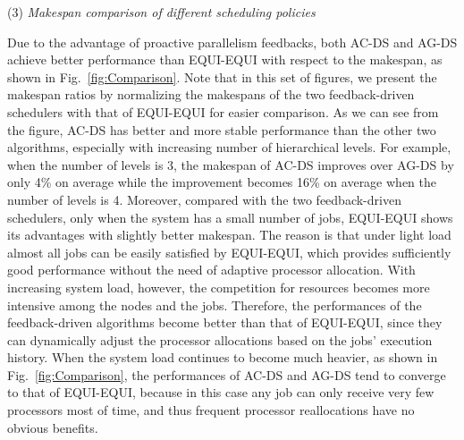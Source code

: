 \documentclass[10pt, a4paper]{article}
\newcommand{\figref}[1]         {Fig.~\ref{fig:#1}}
\begin{document}
\begin{figure*}[t]
\centering

    \caption{Makespan comparisons of AC-DS and AG-DS with EQUI-EQUI.}
    \label{fig:Comparison}
\end{figure*}

\indent(3) \emph{Makespan comparison of different scheduling policies}

Due to the advantage of proactive parallelism feedbacks, both AC-DS and AG-DS achieve better
performance than EQUI-EQUI with respect to the makespan, as shown in \figref{Comparison}. Note that
in this set of figures, we present the makespan ratios by normalizing the makespans of the two
feedback-driven schedulers with that of EQUI-EQUI for easier comparison. As we can see from the
figure, AC-DS has better and more stable performance than the other two algorithms, especially with
increasing number of hierarchical levels. For example, when the number of levels is 3, the makespan
of AC-DS improves over AG-DS by only 4\% on average while the improvement becomes 16\% on average
when the number of levels is 4. Moreover, compared with the two feedback-driven schedulers, only
when the system has a small number of jobs, EQUI-EQUI shows its advantages with slightly better
makespan. The reason is that under light load almost all jobs can be easily satisfied by EQUI-EQUI,
which provides sufficiently good performance without the need of adaptive processor allocation.
With increasing system load, however, the competition for resources becomes more intensive among
the nodes and the jobs. Therefore, the performances of the feedback-driven algorithms become better
than that of EQUI-EQUI, since they can dynamically adjust the processor allocations based on the
jobs' execution history. When the system load continues to become much heavier, as shown in
\figref{Comparison}, the performances of AC-DS and AG-DS tend to converge to that of EQUI-EQUI,
because in this case any job can only receive very few processors most of time, and thus frequent
processor reallocations have no obvious benefits.
\end{document}
